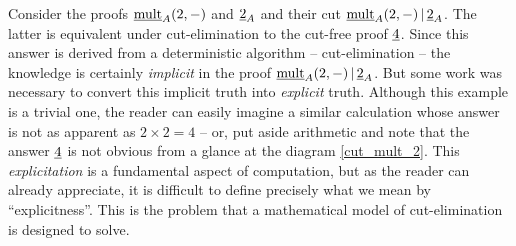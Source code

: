 \documentclass[english,letter paper,12pt,reqno]{article}
\theoremstyle{example}
\numberwithin{equation}{section}
\def\inta{\bold{int}}
\begin{document}
Consider the proofs $\underline{\mathrm{mult}}_A(2,-)$ and $\underline{2}_A$ and their cut $\underline{\mathrm{mult}}_A(2,-) \,|\, \underline{2}_A$. The latter is equivalent under cut-elimination to the cut-free proof $\underline{4}$. Since this answer is derived from a deterministic algorithm -- cut-elimination -- the knowledge is certainly \emph{implicit} in the proof $\underline{\mathrm{mult}}_A(2,-) \,|\, \underline{2}_A$. But some work was necessary to convert this implicit truth into \emph{explicit} truth. Although this example is a trivial one, the reader can easily imagine a similar calculation whose answer is not as apparent as $2 \times 2 = 4$ -- or, put aside arithmetic and note that the answer $\underline{4}$ is not obvious from a glance at the diagram \eqref{cut_mult_2}. This \emph{explicitation} is a fundamental aspect of computation, but as the reader can already appreciate, it is difficult to define precisely what we mean by ``explicitness''. This is the problem that a mathematical model of cut-elimination is designed to solve.
\\
\end{document}
